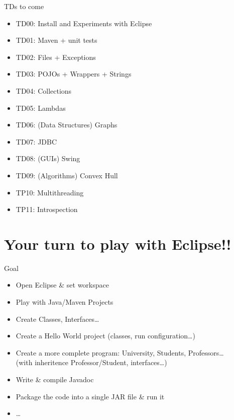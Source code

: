 \documentclass[English,c,%
hyperref={%
    pdftitle={FISA-DE2 OOP in Java},%
    pdfauthor={Muller, Gravier, Laforest, Subercaze},%
    pdfsubject={OOP in Java},%
    pdfkeywords={OOP, Java}%
    },%
xcolor={pdftex,svgnames} %
]{beamer}
\begin{document}
\begin{frame}{TDs to come}

{ \small
  \begin{itemize}
  \item TD00: Install and Experiments with Eclipse
  \item TD01: Maven + unit tests
  \item TD02: Files + Exceptions
  \item TD03: POJOs + Wrappers + Strings
  \item TD04: Collections
  \item TD05: Lambdas
  \item TD06: (Data Structures) Graphs
  \item TD07: JDBC
  \item TD08: (GUIs) Swing
  \item TD09: (Algorithms) Convex Hull
  \item TP10: Multithreading
  \item TP11: Introspection
\end{itemize}
}
\end{frame}

\section{Your turn to play with Eclipse!!}

\begin{frame}{Goal}
\begin{itemize}
    \item Open Eclipse \& set workspace
    \item Play with Java/Maven Projects
    \item Create Classes, Interfaces\ldots{}
    \smallskip
    \item Create a Hello World project (classes, run configuration\ldots{})
    \smallskip
    \item Create a more complete program: University, Students, Professors\ldots\\
    (with inheritence Professor/Student, interfaces\ldots{})
    \smallskip
    \item Write \& compile Javadoc
    \smallskip
    \item Package the code into a single JAR file \& run it
    \item \ldots
\end{itemize}
\end{frame}
\end{document}
